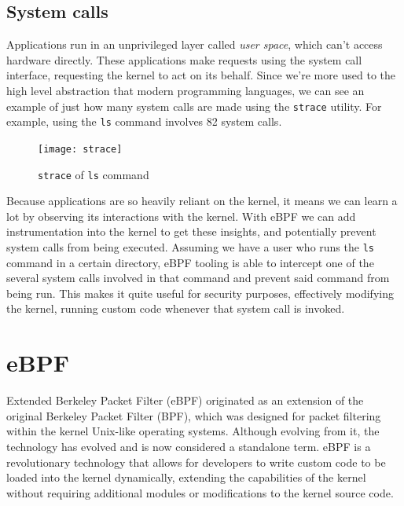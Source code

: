 \subsection{System calls}

Applications run in an unprivileged layer called \textit{user space}, which can't access hardware directly. These applications make requests using the system call interface, requesting the kernel to act on its behalf. Since we're more used to the high level abstraction that modern programming languages, we can see an example of just how many system calls are made using the \texttt{strace} utility. For example, using the \texttt{ls} command involves 82 system calls.
\begin{figure}[h]
    \caption{\texttt{strace} of \texttt{ls} command}
    \centering
    \texttt{[image: strace]}
\end{figure}

Because applications are so heavily reliant on the kernel, it means we can learn a lot by observing its interactions with the kernel. With eBPF we can add instrumentation into the kernel to get these insights, and potentially prevent system calls from being executed.
Assuming we have a user who runs the \texttt{ls} command in a certain directory, eBPF tooling is able to intercept one of the several system calls involved in that command and prevent said command from being run. This makes it quite useful for security purposes, effectively modifying the kernel, running custom code whenever that system call is invoked.

\section{eBPF}

Extended Berkeley Packet Filter (eBPF) \cite{learningeBPF} originated as an extension of the original Berkeley Packet Filter (BPF), which was designed for packet filtering within the kernel Unix-like operating systems. Although evolving from it, the technology has evolved and is now considered a standalone term. eBPF is a revolutionary technology that allows for developers to write custom code to be loaded into the kernel dynamically, extending the capabilities of the kernel without requiring additional modules or modifications to the kernel source code.

